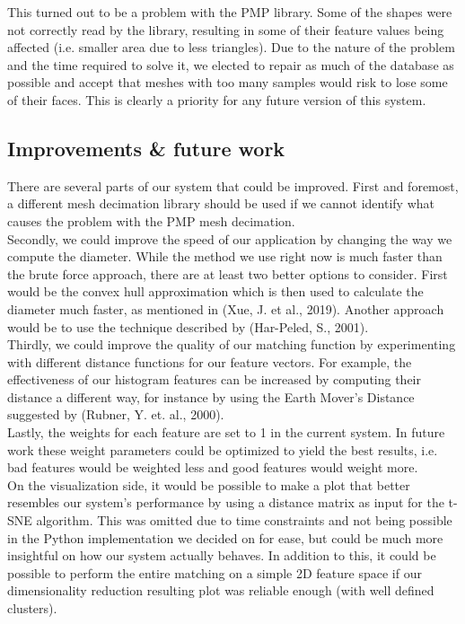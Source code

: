 \documentclass{bigdata}
\begin{document}
This turned out to be a problem with the PMP library. Some of the shapes were not correctly read by the library, resulting in some of their feature values being affected (i.e. smaller area due to less triangles). Due to the nature of the problem and the time required to solve it, we elected to repair as much of the database as possible and accept that meshes with too many samples would risk to lose some of their faces. This is clearly a priority for any future version of this system.

\pagebreak

\subsection{Improvements \& future work}

There are several parts of our system that could be improved. First and foremost, a different mesh decimation library should be used if we cannot identify what causes the problem with the PMP mesh decimation. \\
Secondly, we could improve the speed of our application by changing the way we compute the diameter. While the method we use right now is much faster than the brute force approach, there are at least two better options to consider. First would be the convex hull approximation which is then used to calculate the diameter much faster, as mentioned in (Xue, J. et al., 2019). Another approach would be to use the technique described by (Har-Peled, S., 2001). \\
Thirdly, we could improve the quality of our matching function by experimenting with different distance functions for our feature vectors. For example, the effectiveness of our histogram features can be increased by computing their distance a different way, for instance by using the Earth Mover's Distance suggested by (Rubner, Y. et. al., 2000). \\
Lastly, the weights for each feature are set to 1 in the current system. In future work these weight parameters could be optimized to yield the best results, i.e. bad features would be weighted less and good features would weight more.\\
On the visualization side, it would be possible to make a plot that better resembles our system's performance by using a distance matrix as input for the t-SNE algorithm. This was omitted due to time constraints and not being possible in the Python implementation we decided on for ease, but could be much more insightful on how our system actually behaves. In addition to this, it could be possible to perform the entire matching on a simple 2D feature space if our dimensionality reduction resulting plot was reliable enough (with well defined clusters).
\end{document}

